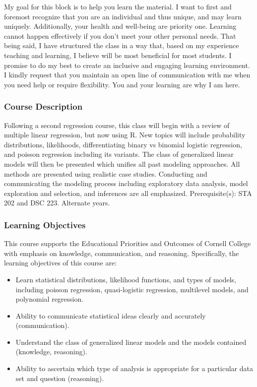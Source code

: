 \documentclass[
  letterpaper,
  DIV=11,
  numbers=noendperiod]{scrartcl}
\begin{document}
My goal for this block is to help you learn the material. I want to
first and foremost recognize that you are an individual and thus unique,
and may learn uniquely. Additionally, your health and well-being are
priority one. Learning cannot happen effectively if you don't meet your
other personal needs. That being said, I have structured the class in a
way that, based on my experience teaching and learning, I believe will
be most beneficial for most students. I promise to do my best to create
an inclusive and engaging learning environment. I kindly request that
you maintain an open line of communication with me when you need help or
require flexibility. You and your learning are why I am here.

\subsubsection{Course Description}\label{course-description}

Following a second regression course, this class will begin with a
review of multiple linear regression, but now using R. New topics will
include probability distributions, likelihoods, differentiating binary
vs binomial logistic regression, and poisson regression including its
variants. The class of generalized linear models will then be presented
which unifies all past modeling approaches. All methods are presented
using realistic case studies. Conducting and communicating the modeling
process including exploratory data analysis, model exploration and
selection, and inferences are all emphasized. Prerequisite(s): STA 202
and DSC 223. Alternate years.

\subsubsection{Learning Objectives}\label{learning-objectives}

This course supports the Educational Priorities and Outcomes of Cornell
College with emphasis on knowledge, communication, and reasoning.
Specifically, the learning objectives of this course are:

\begin{itemize}
\item
  Learn statistical distributions, likelihood functions, and types of
  models, including poisson regression, quasi-logistic regression,
  multilevel models, and polynomial regression.
\item
  Ability to communicate statistical ideas clearly and accurately
  (communication).
\item
  Understand the class of generalized linear models and the models
  contained (knowledge, reasoning).
\item
  Ability to ascertain which type of analysis is appropriate for a
  particular data set and question (reasoning).
\end{itemize}
\end{document}
